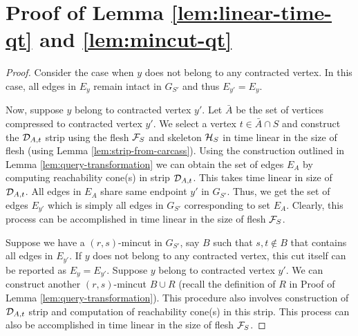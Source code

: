 \section{Proof of Lemma \ref{lem:linear-time-qt} and \ref{lem:mincut-qt}}
\label{appendix:linear-time-qt}
\begin{proof}
Consider the case when $y$ does not belong to any contracted vertex. In this case, all edges in $E_y$ remain intact in $G_{S'}$ and thus $E_{y'}=E_{y}$.

Now, suppose $y$ belong to contracted vertex $y'$. Let $\bar A$ be the set of vertices compressed to contracted vertex $y'$. We select a vertex $t\in {\bar A} \cap S$ and construct the ${\cal D}_{A,t}$ strip using the flesh ${\cal F}_S$ and skeleton ${\cal H}_S$ in time linear in the size of flesh (using Lemma \ref{lem:strip-from-carcass}). Using the construction outlined in Lemma \ref{lem:query-transformation} we can obtain the set of edges $E_{A}$ by computing reachability cone(s) in strip ${\cal D}_{A,t}$. This takes time linear in size of ${\cal D}_{A,t}$. All edges in $E_A$ share same endpoint $y'$ in $G_{S'}$. Thus, we get the set of edges $E_{y'}$ which is simply all edges in $G_{S'}$ corresponding to set $E_A$. Clearly, this process can be accomplished in time linear in the size of flesh ${\cal F}_S$.

Suppose we have a $(r,s)$-mincut in $G_{S'}$, say $B$ such that $s,t \not\in B$ that contains all edges in $E_{y'}$. If $y$ does not belong to any contracted vertex, this cut itself can be reported as $E_y=E_{y'}$. Suppose $y$ belong to contracted vertex $y'$. We can construct another $(r,s)$-mincut $B\cup R$ (recall the definition of $R$ in Proof of Lemma \ref{lem:query-transformation}). This procedure also involves construction of ${\cal D}_{A,t}$ strip and computation of reachability cone(s) in this strip. This process can also be accomplished in time linear in the size of flesh ${\cal F}_S$.
\end{proof}



